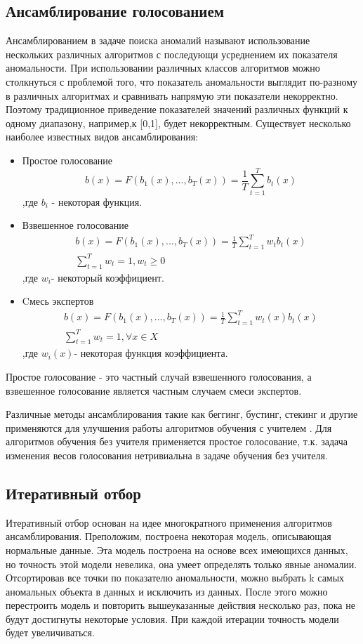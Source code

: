 \subsection{Ансамблирование голосованием}
Ансамблированием в задаче поиска аномалий называют использование нескольких различных алгоритмов с последующи усреднением их показателя аномальности. При использовании различных классов алгоритмов можно столкнуться с проблемой того, что показатель аномальности выглядит по-разному в различных алгоритмах и сравнивать напрямую эти показатели некорректно.  Поэтому традиционное приведение  показателей значений различных функций к одному диапазону, например,к [0,1], будет некорректным.
Существует несколько наиболее известных видов ансамблирования:
\begin{itemize}
	\item Простое голосование 
	\begin{equation}
	b(x)=F(b_1(x),...,b_T(x))=\frac{1}{T}\sum_{t=1}^{T}b_t(x)
	\end{equation}
	,где $b_i$ -  некоторая функция.
	\item Взвешенное голосование 
	\begin{gather}
	b(x)=F(b_1(x),...,b_T(x))=\frac{1}{T}\sum_{t=1}^{T}w_tb_t(x)\\
		\sum_{t=1}^{T}w_t=1, w_t \geq 0
	\end{gather}
	,где $w_i$- некоторый коэффициент.
		\item Cмесь экспертов
		\begin{gather}
		b(x)=F(b_1(x),...,b_T(x))=\frac{1}{T}\sum_{t=1}^{T}w_t(x)b_t(x)\\
		\sum_{t=1}^{T}w_t=1, \forall x\in X
		\end{gather}
		,где $w_i(x)$- некоторая функция коэффициента.
 \end{itemize}
	Простое голосование - это  частный случай взвешенного голосования, а взвешенное голосование является частным случаем смеси экспертов. 
	
	Различные методы ансамблирования такие как беггинг, бустинг, стекинг и другие применяются для улучшения работы алгоритмов обучения с учителем . Для алгоритмов обучения без учителя применяется простое голосование, т.к. задача изменения весов голосования нетривиальна в задаче обучения без учителя\cite{Book16}.
\subsection{Итеративный отбор}
Итеративный отбор основан на идее многократного применения алгоритмов ансамблирования. Преположим, построена некоторая модель, описывающая нормальные данные. Эта модель построена на основе всех  имеющихся данных, но точность этой модели невелика, она умеет определять только явные аномалии. Отсортировав все точки по показателю аномальности, можно выбрать k самых аномальных объекта в данных и исключить из данных. После этого можно перестроить модель и повторить вышеуказанные действия несколько раз, пока не будут достигнуты некоторые условия. При каждой итерации точность модели будет увеличиваться.

